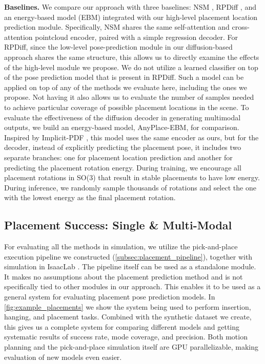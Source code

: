 \noindent \textbf{Baselines.}
We compare our approach with three baselines: NSM \cite{chen2022neural}, RPDiff \cite{simeonov2023rpdiff}, and an energy-based model (EBM) integrated with our high-level placement location prediction module. Specifically, NSM shares the same self-attention and cross-attention pointcloud encoder, paired with a simple regression decoder. For RPDiff, since the low-level pose-prediction module in our diffusion-based approach shares the same structure, this allows us to directly examine the effects of the high-level module we propose.
We do not utilize a learned classifier on top of the pose prediction model that is present in RPDiff. Such a model can be applied on top of any of the methods we evaluate here, including the ones we propose. Not having it also allows us to evaluate the number of samples needed to achieve particular coverage of possible placement locations in the scene.
To evaluate the effectiveness of the diffusion decoder in generating multimodal outputs, we build an energy-based model, AnyPlace-EBM, for comparison. Inspired by Implicit-PDF \cite{implicitpdf2021}, this model uses the same encoder as ours, but for the decoder, instead of explicitly predicting the placement pose, it includes two separate branches: one for placement location prediction and another for predicting the placement rotation energy. During training, we encourage all placement rotations in SO(3) that result in stable placements to have low energy. During inference, we randomly sample thousands of rotations and select the one with the lowest energy as the final placement rotation. 



\subsection{\textbf{Placement Success: Single \& Multi-Modal}}
For evaluating all the methods in simulation, we utilize the pick-and-place execution pipeline we constructed (\autoref{subsec:placement_pipeline}), together with simulation in IsaacLab \cite{mittal2023orbit}.
The pipeline itself can be used as a standalone module. It makes no assumptions about the placement prediction method and is not specifically tied to other modules in our approach.
This enables it to be used as a general system for evaluating placement pose prediction models.
In \autoref{fig:example_placements} we show the system being used to perform insertion, hanging, and placement tasks.
Combined with the synthetic dataset we create, this gives us a complete system for comparing different models and getting systematic results of success rate, mode coverage, and precision.
Both motion planning and the pick-and-place simulation itself are GPU parallelizable, making evaluation of new models even easier.


